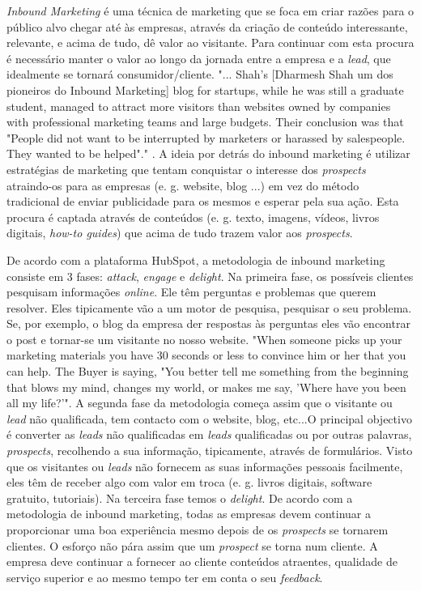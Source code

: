 \textit{Inbound Marketing} é uma técnica de marketing que se foca em criar razões para o público alvo chegar até às empresas, através da criação de conteúdo interessante, relevante, e acima de tudo, dê valor ao visitante. Para continuar com esta procura é necessário manter o valor ao longo da jornada entre a empresa e a \textit{\gls{lead}}, que idealmente se tornará consumidor/cliente. "... Shah’s [Dharmesh Shah um dos pioneiros do Inbound Marketing] blog for startups, while he was still a graduate student, managed to attract more visitors than websites owned by companies with professional marketing teams and large budgets. Their conclusion was that "People did not want to be interrupted by marketers or harassed by salespeople. They wanted to be helped"."\cite{inbound_paper} . A ideia por detrás do inbound marketing é utilizar estratégias de marketing que tentam conquistar o interesse dos \textit{\gls{prospects}} atraindo-os para as empresas (e. g. website, blog ...) em vez do método tradicional de enviar publicidade para os mesmos e esperar pela sua ação. Esta procura é captada através de conteúdos (e. g. texto, imagens, vídeos, livros digitais, \textit{how-to guides}) que acima de tudo trazem valor aos \textit{\gls{prospects}}.

De acordo com a plataforma HubSpot\cite{HubSpot}, a metodologia de inbound marketing consiste em 3 fases: \textit{attack}, \textit{engage} e \textit{delight}. Na primeira fase, os possíveis clientes pesquisam informações \textit{online}. Ele têm perguntas e problemas que querem resolver. Eles tipicamente vão a um motor de pesquisa, pesquisar o seu problema. Se, por exemplo, o blog da empresa der respostas às perguntas eles vão encontrar o post e tornar-se um visitante no nosso website.
 "When someone picks up your marketing materials you have 30 seconds or less to convince him or her that you can help. The Buyer is saying, "You better tell me something from the beginning that blows my mind, changes my world, or makes me say, 'Where have you been all my life?'"\cite{pbr}. 
A segunda fase da metodologia começa assim que o visitante ou \textit{lead} não qualificada, tem contacto com o website, blog, etc...O principal objectivo é converter as \textit{leads} não qualificadas em \textit{leads} qualificadas ou por outras palavras, \textit{prospects}, recolhendo a sua informação, tipicamente, através de formulários. Visto que os visitantes ou \textit{leads} não fornecem as suas informações pessoais facilmente, eles têm de receber algo com valor em troca (e. g. livros digitais, software gratuito, tutoriais). 
Na terceira fase temos o \textit{delight}. De acordo com a metodologia de inbound marketing, todas as empresas devem continuar a proporcionar uma boa experiência mesmo depois de os \textit{prospects} se tornarem clientes. O esforço não pára assim que um \textit{prospect} se torna num cliente. A empresa deve continuar a fornecer ao cliente conteúdos atraentes, qualidade de serviço superior e ao mesmo tempo ter em conta o seu \textit{feedback}. 

